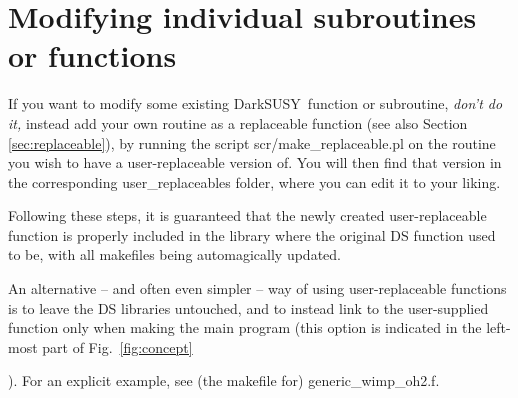 \documentclass[a4paper,10pt,oneside]{book}
\newcommand{\tb}[1]{{\color{magenta}\bf (TB: #1)}}
\newcommand{\code}[1]{\ft{#1}}
\newcommand{\ds}{{\sffamily DarkSUSY}}
\newcommand{\ft}[1]{\textsf{#1}}
\begin{document}




\section{Modifying individual subroutines or functions}

 If you want to modify some existing \ds\ function or subroutine, \emph{don't do it,} instead add your own routine as a replaceable function (see also Section \ref{sec:replaceable}), 
 by running the script \code{scr/make\_replaceable.pl} on the routine you wish to have a user-replaceable version of.
You will then find that version in the corresponding \code{user\_replaceables} folder, 
where you can edit it to your liking. 
{
Following these steps, it is guaranteed that the newly created user-replaceable function
is properly included in the library where the original DS function used to be, with all 
makefiles being automagically updated. 

An alternative -- and often even simpler -- way of using user-replaceable functions is to leave 
the DS libraries untouched, and to 
instead link to the user-supplied function only when making the main program (this option
is indicated in the left-most part of Fig.~\ref{fig:concept}}). For an explicit example,
see (the makefile for) \code{generic\_wimp\_oh2.f}.
\end{document}
